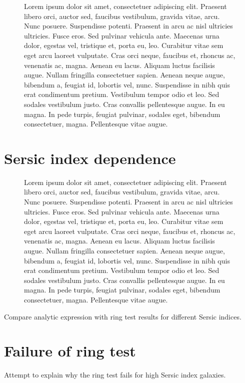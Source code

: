 \documentclass[apj]{emulateapj}
\begin{document}
\begin{figure*}
\begin{center}
\end{center}
\caption[fig1]{\label{fig:one} Lorem ipsum dolor sit amet,
  consectetuer adipiscing elit. Praesent libero orci, auctor sed,
  faucibus vestibulum, gravida vitae, arcu. Nunc posuere. Suspendisse
  potenti. Praesent in arcu ac nisl ultricies ultricies. Fusce
  eros. Sed pulvinar vehicula ante. Maecenas urna dolor, egestas vel,
  tristique et, porta eu, leo. Curabitur vitae sem eget arcu laoreet
  vulputate. Cras orci neque, faucibus et, rhoncus ac, venenatis ac,
  magna. Aenean eu lacus. Aliquam luctus facilisis augue. Nullam
  fringilla consectetuer sapien. Aenean neque augue, bibendum a,
  feugiat id, lobortis vel, nunc. Suspendisse in nibh quis erat
  condimentum pretium. Vestibulum tempor odio et leo. Sed sodales
  vestibulum justo. Cras convallis pellentesque augue. In eu magna. In
  pede turpis, feugiat pulvinar, sodales eget, bibendum consectetuer,
  magna. Pellentesque vitae augue.}
\end{figure*}

\section{Sersic index dependence}\label{sec:sersic}

\begin{figure}
\begin{center}
\end{center}
\caption[fig2]{\label{fig:two} Lorem ipsum dolor sit amet,
  consectetuer adipiscing elit. Praesent libero orci, auctor sed,
  faucibus vestibulum, gravida vitae, arcu. Nunc posuere. Suspendisse
  potenti. Praesent in arcu ac nisl ultricies ultricies. Fusce
  eros. Sed pulvinar vehicula ante. Maecenas urna dolor, egestas vel,
  tristique et, porta eu, leo. Curabitur vitae sem eget arcu laoreet
  vulputate. Cras orci neque, faucibus et, rhoncus ac, venenatis ac,
  magna. Aenean eu lacus. Aliquam luctus facilisis augue. Nullam
  fringilla consectetuer sapien. Aenean neque augue, bibendum a,
  feugiat id, lobortis vel, nunc. Suspendisse in nibh quis erat
  condimentum pretium. Vestibulum tempor odio et leo. Sed sodales
  vestibulum justo. Cras convallis pellentesque augue. In eu magna. In
  pede turpis, feugiat pulvinar, sodales eget, bibendum consectetuer,
  magna. Pellentesque vitae augue.}
\end{figure}

Compare analytic expression with ring test results for different Sersic indices.

\section{Failure of ring test}\label{sec:failure}
Attempt to explain why the ring test fails for high Sersic index galaxies.

\acknowledgements

%
\end{document}
